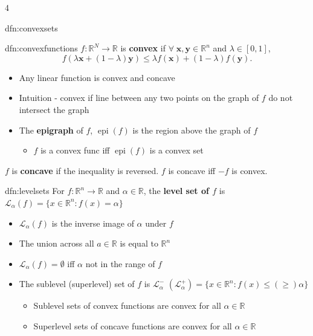 \documentclass[landscape, 8pt]{extarticle}
\DeclareMathOperator{\epi}{epi}
\begin{document}
\begin{multicols*}{4}
\begin{dfn}{dfn:convexsets}{ }
		\end{dfn}
		
		
		\begin{dfn}{dfn:convexfunctions}{ }
			$f: \mathbb{R}^N \to \mathbb{R}$ is \textbf{convex} if $\forall \; \mathbf{x, y}\in \mathbb{R}^n$ and $\lambda\in [0, 1]$, $$f(\lambda \mathbf{x} + (1-\lambda)\mathbf{y}) \le \lambda f(\mathbf{x}) + (1-\lambda)f(\mathbf{y}).$$
			\begin{itemize}
				\item Any linear function is convex and concave
				\item Intuition - convex if line between any two points on the graph of $f$ do not intersect the graph
				\item The \textbf{epigraph} of $f$, $\epi(f)$ is the region above the graph of $f$
				\begin{itemize}
					\item $f$ is a convex func iff $\epi(f)$ is a convex set
				\end{itemize}
			\end{itemize}
			$f$ is \textbf{concave} if the inequality is reversed. $f$ is concave iff $-f$ is convex.
		\end{dfn}
		
		
		\begin{dfn}{dfn:levelsets}{ }
			For $f: \mathbb{R}^n \to \mathbb{R}$ and $\alpha\in \mathbb{R}$, the \textbf{level set of $f$} is $\mathcal{L}_{\alpha}(f) = \{x\in \mathbb{R}^n : f(x) = \alpha\}$
			\begin{itemize}
				\item $\mathcal{L}_\alpha(f)$ is the inverse image of $\alpha$ under $f$
				\item The union across all $a\in\mathbb{R}$ is equal to $\mathbb{R}^n$
				\item $\mathcal{L}_\alpha(f) = \emptyset$ iff $\alpha$ not in the range of $f$
				\item The sublevel (superlevel) set of $f$ is $\mathcal{L}_\alpha^-$ $(\mathcal{L}_\alpha^+)= \{x\in \mathbb{R}^n : f(x) \le (\ge) \alpha\}$
				\begin{itemize}
					\item Sublevel sets of convex functions are convex for all $\alpha\in \mathbb{R}$
					\item Superlevel sets of concave functions are convex for all $\alpha\in \mathbb{R}$
				\end{itemize}
			\end{itemize}
		\end{dfn}
		

\end{multicols*}
\end{document}
